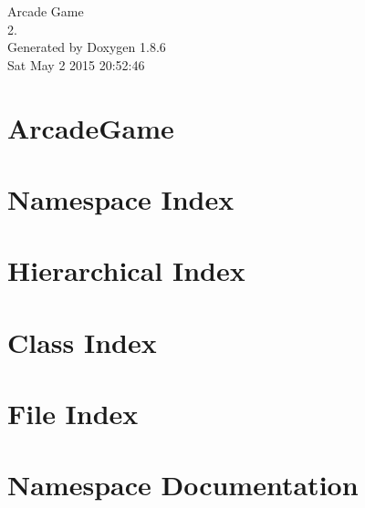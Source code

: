 \documentclass[twoside]{book}
\newcommand{\clearemptydoublepage}{%
  \newpage{\pagestyle{empty}\cleardoublepage}%
}
\begin{document}
\hypersetup{pageanchor=false}
\begin{titlepage}
\vspace*{7cm}
\begin{center}%
{\Large Arcade Game \\[1ex]\large 2. }\\
\vspace*{1cm}
{\large Generated by Doxygen 1.8.6}\\
\vspace*{0.5cm}
{\small Sat May 2 2015 20:52:46}\\
\end{center}
\end{titlepage}
\clearemptydoublepage
\tableofcontents
\clearemptydoublepage
{}
\hypersetup{pageanchor=true}

\chapter{Arcade\-Game}
\label{md__r_e_a_d_m_e}
\hypertarget{md__r_e_a_d_m_e}{}

\chapter{Namespace Index}

\chapter{Hierarchical Index}

\chapter{Class Index}

\chapter{File Index}

\chapter{Namespace Documentation}



\end{document}
